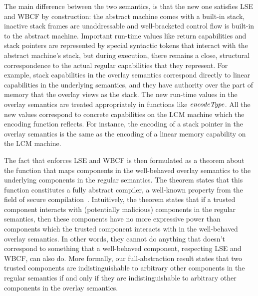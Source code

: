 \documentclass[acmsmall,screen]{acmart}\settopmatter{}
\newcommand{\trgcm}{\textsc{LCM}}
\newenvironment{jversion}%
    {\color{OliveGreen}}{}
\begin{document}
The main difference between the two semantics, is that the new one satisfies LSE and WBCF by construction: the abstract machine comes with a built-in stack, inactive stack frames are unaddressable and well-bracketed control flow is built-in to the abstract machine.
Important run-time values like return capabilities and stack pointers are represented by special syntactic tokens that interact with the abstract machine's stack, but during execution, there remains a close, structural correspondence to the actual regular capabilities that they represent.
For example, stack capabilities in the overlay semantics correspond directly to linear capabilities in the underlying semantics, and they have authority over the part of memory that the overlay views as the stack.
\begin{jversion}
The new run-time values in the overlay semantics are treated appropriately in functions like $\encType{}$.
All the new values correspond to concrete capabilities on the \trgcm{} machine which the encoding function reflects.
For instance, the encoding of a stack pointer in the overlay semantics is the same as the encoding of a linear memory capability on the \trgcm{} machine.
\end{jversion}

The fact that \stktokens{} enforces LSE and WBCF is then formulated as a theorem about the function that maps components in the well-behaved overlay semantics to the underlying components in the regular semantics.
The theorem states that this function constitutes a fully abstract compiler, a well-known property from the field of secure compilation~\cite{abadi_protection_1999}.
Intuitively, the theorem states that if a trusted component interacts with (potentially malicious) components in the regular semantics, then these components have no more expressive power than components which the trusted component interacts with in the well-behaved overlay semantics.
In other words, they cannot do anything that doesn't correspond to something that a well-behaved component, respecting LSE and WBCF, can also do.
More formally, our full-abstraction result states that two trusted components are indistinguishable to arbitrary other components in the regular semantics if and only if they are indistinguishable to arbitrary other components in the overlay semantics.
\end{document}
